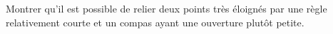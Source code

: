 Montrer qu'il est possible de relier deux points très éloignés par une règle relativement courte et un compas ayant une ouverture plutôt petite.
